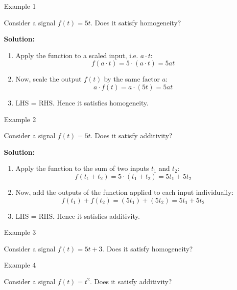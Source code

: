 \documentclass[aspectratio=169,xcolor=dvipsnames,svgnames,x11names,fleqn]{beamer}
\begin{document}
\begin{frame}{Example 1}

    Consider a signal $f(t) = 5t$.  Does it satisfy homogeneity?

    \bigskip

    \textbf{Solution:}

    \begin{enumerate}
        \item Apply the function to a scaled input, i.e. $a \cdot t$: $$f(a\cdot t) = 5 · (a\cdot t) = 5a t$$
        \item Now, scale the output $f(t)$ by the same factor $a$: $$a\cdot f(t) = a\cdot  (5t) = 5at$$
        \item LHS = RHS. Hence it satisfies homogeneity.
    \end{enumerate}
    
\end{frame}

\begin{frame}{Example 2}
    
    Consider a signal $f(t) = 5t$.  Does it satisfy additivity?

    \bigskip

    \textbf{Solution:}

    \begin{enumerate}
        \item Apply the function to the sum of two inputs $t_1$ and $t_2$: $$f(t_1 + t_2) = 5 · (t_1 + t_2) = 5t_1 + 5t_2$$
        \item Now, add the outputs of the function applied to each input individually: $$ f(t_1) + f(t_2) = (5t_1) + (5t_2) = 5t_1 + 5t_2 $$
        \item LHS = RHS. Hence it satisfies additivity.
    \end{enumerate}


\end{frame}

\begin{frame}{Example 3}
    

    Consider a signal $f(t) = 5t+3$.  Does it satisfy homogeneity?

    \vfill

\end{frame}

\begin{frame}{}
    
\end{frame}

\begin{frame}{Example 4}
    

    Consider a signal $f(t) = t^2$.  Does it satisfy additivity?

    \vfill

\end{frame}
\end{document}

